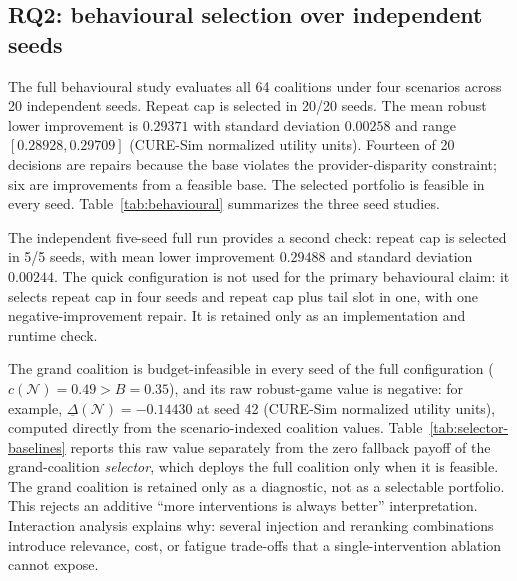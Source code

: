 \documentclass[review]{elsarticle}
\theoremstyle{plain}
\theoremstyle{definition}
\theoremstyle{remark}
\newcommand{\Players}{\mathcal{N}}
\begin{document}
\subsection{RQ2: behavioural selection over independent seeds}\label{sec:rq2}

The full behavioural study evaluates all 64 coalitions under four scenarios across 20 independent seeds. Repeat cap is selected in 20/20 seeds. The mean robust lower improvement is $0.29371$ with standard deviation $0.00258$ and range $[0.28928,0.29709]$ (CURE-Sim normalized utility units). Fourteen of 20 decisions are repairs because the base violates the provider-disparity constraint; six are improvements from a feasible base. The selected portfolio is feasible in every seed. Table~\ref{tab:behavioural} summarizes the three seed studies.

The independent five-seed full run provides a second check: repeat cap is selected in 5/5 seeds, with mean lower improvement $0.29488$ and standard deviation $0.00244$. The quick configuration is not used for the primary behavioural claim: it selects repeat cap in four seeds and repeat cap plus tail slot in one, with one negative-improvement repair. It is retained only as an implementation and runtime check.

\begin{table}[t]
\caption{Behavioural exact-game seed studies. Lower improvement is the worst-scenario utility change relative to the base policy.}\label{tab:behavioural}
\centering
\scriptsize
\setlength{\tabcolsep}{3pt}
\end{table}

The grand coalition is budget-infeasible in every seed of the full configuration ($c(\Players)=0.49>B=0.35$), and its raw robust-game value is negative: for example, $\underline{\Delta}(\Players)=-0.14430$ at seed 42 (CURE-Sim normalized utility units), computed directly from the scenario-indexed coalition values. Table~\ref{tab:selector-baselines} reports this raw value separately from the zero fallback payoff of the grand-coalition \emph{selector}, which deploys the full coalition only when it is feasible. The grand coalition is retained only as a diagnostic, not as a selectable portfolio. This rejects an additive ``more interventions is always better'' interpretation. Interaction analysis explains why: several injection and reranking combinations introduce relevance, cost, or fatigue trade-offs that a single-intervention ablation cannot expose.
\end{document}
